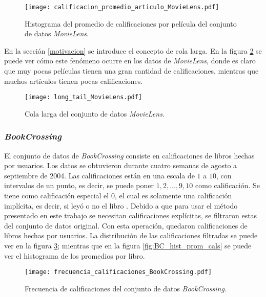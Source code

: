 \begin{figure}[H]
	\centering
 	\texttt{[image: calificacion\_promedio\_articulo\_MovieLens.pdf]}
 	\caption{Histograma del promedio de calificaciones por película del conjunto de datos \textit{MovieLens}.}
 	\label{fig:ML_hist_prom_cals}
\end{figure}

En la sección \ref{motivacion} se introduce el concepto de cola larga. En la figura \ref{fig:ML_long_tail} se puede ver cómo este fenómeno ocurre en los datos de \textit{MovieLens}, donde es claro que muy pocas películas tienen una gran cantidad de calificaciones, mientras que muchos artículos tienen pocas calificaciones.

\begin{figure}[H]
	\centering
 	\texttt{[image: long\_tail\_MovieLens.pdf]}
 	\caption{Cola larga del conjunto de datos \textit{MovieLens}.}
 	\label{fig:ML_long_tail}
\end{figure}


\subsubsection{\textit{BookCrossing}}

El conjunto de datos de \textit{BookCrossing} consiste en  calificaciones de  libros hechas por  usuarios. Los datos se obtuvieron durante cuatro semanas de agosto a septiembre de 2004. Las calificaciones están en una escala de $1$ a $10$, con intervalos de un punto, es decir, se puede poner $1, 2, \hdots, 9, 10$ como calificación. Se tiene como calificación especial el $0$, el cual es solamente una calificación implícita, es decir, si leyó o no el libro \cite{ziegler2005improving}. Debido a que para usar el método presentado en este trabajo se necesitan calificaciones explícitas, se filtraron estas del conjunto de datos original. Con esta operación, quedaron  calificaciones de  libros hechas por  usuarios. La distribución de las calificaciones filtradas se puede ver en la figura \ref{fig:BC_frec_calificaciones}; mientras que en la figura \ref{fig:BC_hist_prom_cals} se puede ver el histograma de los promedios por libro.

\begin{figure}[H]
	\centering
 	\texttt{[image: frecuencia\_calificaciones\_BookCrossing.pdf]}
 	\caption{Frecuencia de calificaciones del conjunto de datos \textit{BookCrossing}.}
 	\label{fig:BC_frec_calificaciones}
\end{figure}


